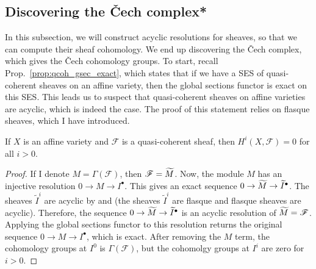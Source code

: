 \subsection{Discovering the \v Cech complex*}
In this subsection, we will construct acyclic resolutions for sheaves,
so that we can compute their sheaf cohomology. We end up discovering
the \v Cech complex, which gives the \v Cech cohomology groups.
To start, recall Prop.~\ref{prop:qcoh_gsec_exact},
which states that if we have a SES of quasi-coherent sheaves on an affine
variety, then the global sections functor is exact on this SES.
This leads us to suspect that quasi-coherent sheaves on affine varieties
are acyclic, which is indeed the case. The proof of this statement relies
on flasque sheaves, which I have introduced.
\begin{lemm}%
  \label{lemm:affine_cohom_vanishes}
  If $X$ is an affine variety and $\mathscr{F}$ is a quasi-coherent
  sheaf, then $H^{i}(X, \mathscr{F})=0$ for all $i>0$.
\end{lemm}
\begin{proof}
  If I denote $M=\Gamma(\mathscr{F})$, then $\mathscr{F}=\widetilde{M}$. Now, the
  module $M$ has an injective resolution $0\to M\to I^{\bullet}$.
  This gives an exact sequence $0\to \widetilde{M}\to\widetilde{I}^{\bullet}$.
  The sheaves $\widetilde{I}^{i}$ are acyclic by
  \cite[Prop. 3.4]{hartshorne} and \cite[Prop. 2.5]{hartshorne}
  (the sheaves $\widetilde{I}^{i}$ are flasque and flasque sheaves
  are acyclic). Therefore, the sequence $0\to \widetilde{M}\to\widetilde{I}^{\bullet}$
  is an acyclic resolution of $\widetilde{M}=\mathscr{F}$. Applying the global sections
  functor to this resolution returns the original sequence
  $0\to M\to I^{\bullet}$, which is exact. After removing the $M$ term, the
  cohomology groups at $I^{0}$ is $\Gamma(\mathscr{F})$, but the cohomolgy
  groups at $I^{i}$ are zero for $i>0$.
\end{proof}

